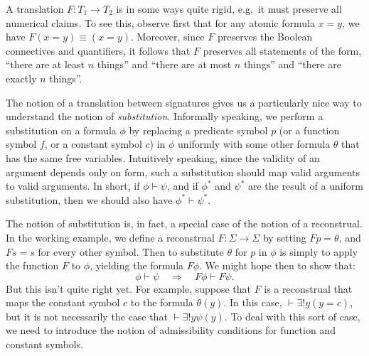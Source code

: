 \begin{disc} A translation $F:T_1\to T_2$ is in some ways quite rigid,
  e.g.\ it must preserve all numerical claims.  To see this, observe
  first that for any atomic formula $x=y$, we have
  $F(x=y)\equiv (x=y)$.  Moreover, since $F$ preserves the Boolean
  connectives and quantifiers, it follows that $F$ preserves all
  statements of the form, ``there are at least $n$ things'' and
  ``there are at most $n$ things'' and ``there are exactly $n$
  things''.
\end{disc}




The notion of a translation between signatures gives us a particularly
nice way to understand the notion of \emph{substitution}.  Informally
speaking, we perform a substitution on a formula $\phi$ by replacing a
predicate symbol $p$ (or a function symbol $f$, or a constant symbol
$c$) in $\phi$ uniformly with some other formula $\theta$ that has the
same free variables.  Intuitively speaking, since the validity of an
argument depends only on form, such a substitution should map valid
arguments to valid arguments.  In short, if $\phi\vdash\psi$, and if
$\phi ^*$ and $\psi ^*$ are the result of a uniform substitution, then
we should also have $\phi ^*\vdash \psi ^*$.

The notion of substitution is, in fact, a special case of the notion
of a reconstrual.  In the working example, we define a reconstrual
$F:\Sigma\to\Sigma$ by setting $Fp=\theta$, and $Fs=s$ for every other
symbol.  Then to substitute $\theta$ for $p$ in $\phi$ is simply to
apply the function $F$ to $\phi$, yielding the formula $F\phi$.  We
might hope then to show that:
\[ \phi\vdash\psi \quad \Longrightarrow \quad F\phi\vdash F\psi .\]
But this isn't quite right yet.  For example, suppose that $F$ is a
reconstrual that maps the constant symbol $c$ to the formula
$\theta (y)$.  In this case, $\vdash \exists !y(y=c)$, but it is not
necessarily the case that $\vdash \exists !y\psi (y)$.  To deal with
this sort of case, we need to introduce the notion of admissibility
conditions for function and constant symbols.

